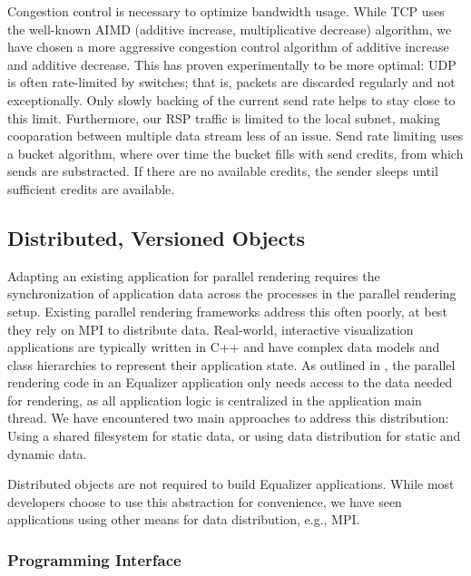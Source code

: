 \documentclass[10pt,journal,compsoc]{IEEEtran}
\begin{document}
Congestion control is necessary to optimize bandwidth usage. While TCP uses the
well-known AIMD (additive increase, multiplicative decrease) algorithm, we have
chosen a more aggressive congestion control algorithm of additive increase and
additive decrease. This has proven experimentally to be more optimal: UDP is
often rate-limited by switches; that is, packets are discarded regularly and not
exceptionally. Only slowly backing of the current send rate helps to stay close
to this limit. Furthermore, our RSP traffic is limited to the local subnet,
making cooparation between multiple data stream less of an issue. Send rate
limiting uses a bucket algorithm, where over time the bucket fills with send
credits, from which sends are substracted. If there are no available credits,
the sender sleeps until sufficient credits are available.

\subsection{Distributed, Versioned Objects}

Adapting an existing application for parallel rendering requires the
synchronization of application data across the processes in the parallel
rendering setup. Existing parallel rendering frameworks address this often
poorly, at best they rely on MPI to distribute data. Real-world, interactive
visualization applications are typically written in C++ and have complex data
models and class hierarchies to represent their application state. As outlined
in \cite{EMP:09}, the parallel rendering code in an \textsf{Equalizer}
application only
needs access to the data needed for rendering, as all application logic is
centralized in the application main thread. We have encountered two main
approaches to address this distribution: Using a shared filesystem for static
data, or using data distribution for static and dynamic data.

Distributed objects are not required to build \textsf{Equalizer} applications.
While most
developers choose to use this abstraction for convenience, we have seen
applications using other means for data distribution, e.g., MPI.

\subsubsection{Programming Interface}
\end{document}
